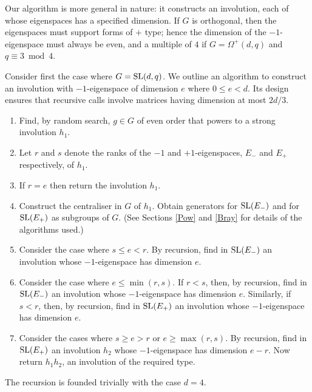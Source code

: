 \documentclass[12pt]{article}
\def\SL{{\rm SL}}
\begin{document}
Our algorithm is more general in nature:
it constructs an involution, each of whose eigenspaces
has a specified dimension.
If $G$ is orthogonal, then the eigenspaces
must support forms of $+$ type; 
hence the dimension of the $-1$-eigenspace 
must always be even, and a multiple of $4$
if $G=\Omega^+(d,q)$ and $q\equiv3\bmod4$.

Consider first the case where $G = \SL(d, q)$. 
We outline an algorithm to construct 
an involution with $-1$-eigenspace of dimension 
$e$ where $0 \leq e < d$. 
Its design ensures that recursive calls
involve matrices having dimension at most $2d/3$.
\begin{enumerate}
\item 
Find, by random search, $g \in G$ of even order
that powers to a strong involution $h_1$.

\item Let $r$ and $s$ denote the ranks of the 
$-1$ and $+1$-eigenspaces, $E_-$ and $E_+$ respectively, of $h_1$.

\item If $r = e$ then return the involution $h_1$.
 
\item 
Construct the centraliser in $G$ of $h_1$.
Obtain generators for $\SL(E_-)$ and for $\SL(E_+)$ as subgroups of $G$. 
(See Sections \ref{Pow} and \ref{Bray} for details of the algorithms used.)

\item 
Consider the case where $s \leq e < r$. By recursion, find 
in $\SL(E_-)$ an involution whose $-1$-eigenspace has dimension $e$. 

\item 
Consider the case where $e \leq \min(r, s)$.
If $r < s$, then, by recursion, find 
in $\SL(E_-)$ an involution whose $-1$-eigenspace has dimension $e$. 
Similarly, if $s < r$, then, by recursion, 
find in $\SL(E_+)$ an involution
whose $-1$-eigenspace has dimension $e$. 

\item 
Consider the cases where $s \geq e > r$ or $e \geq \max(r, s)$.
By recursion, find in $\SL(E_+)$ an involution $h_2$ 
whose $-1$-eigenspace has dimension $e-r$. 
Now return $h_1h_2$, an involution of the required type. 
\end{enumerate}
The recursion is founded trivially with the case $d=4$.
\end{document}
